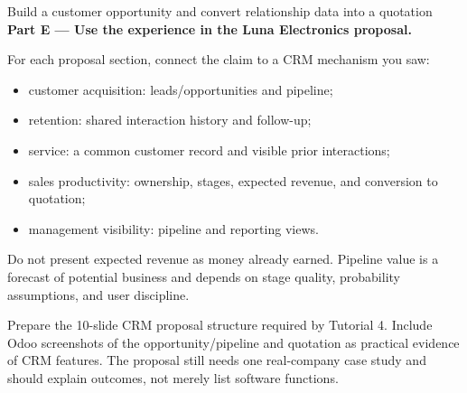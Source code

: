 \begin{labproject}{Build a customer opportunity and convert relationship data into a quotation}
\medskip\noindent\textbf{Part E --- Use the experience in the Luna Electronics proposal.}

For each proposal section, connect the claim to a CRM mechanism you saw:
\begin{itemize}
  \item customer acquisition: leads/opportunities and pipeline;
  \item retention: shared interaction history and follow-up;
  \item service: a common customer record and visible prior interactions;
  \item sales productivity: ownership, stages, expected revenue, and conversion to quotation;
  \item management visibility: pipeline and reporting views.
\end{itemize}

\begin{pitfall}
Do not present expected revenue as money already earned. Pipeline value is a forecast of potential business and depends on stage quality, probability assumptions, and user discipline.
\end{pitfall}
\end{labproject}

\begin{labdeliverable}
Prepare the 10-slide CRM proposal structure required by Tutorial 4. Include Odoo screenshots of the opportunity/pipeline and quotation as practical evidence of CRM features. The proposal still needs one real-company case study and should explain outcomes, not merely list software functions.
\end{labdeliverable}
